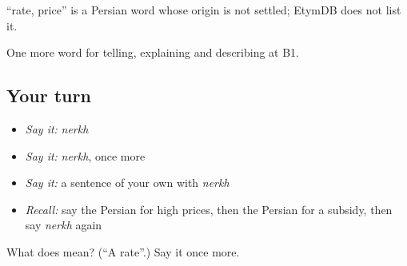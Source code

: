 \begin{cousinweb}
\textbf{} \textquotedblleft{}rate, price\textquotedblright{} is a Persian word whose origin is not settled; EtymDB does not list it.
\end{cousinweb}

\begin{grammarlens}[title={What you've built}]
One more word for telling, explaining and describing at B1.
\end{grammarlens}

\subsection*{Your turn}
\begin{itemize}
\raggedright
  \item \emph{Say it:} \emph{nerkh}
  \item \emph{Say it:} \emph{nerkh}, once more
  \item \emph{Say it:} a sentence of your own with \emph{nerkh}
  \item \emph{Recall:} say the Persian for high prices, then the Persian for a subsidy, then say \emph{nerkh} again
\end{itemize}

\begin{tcolorbox}[breakable,colback=teal!4,colframe=teal!35!black,title={Before you move on}]
What does  mean? (\textquotedblleft{}A rate\textquotedblright{}.) Say it once more.
\end{tcolorbox}
